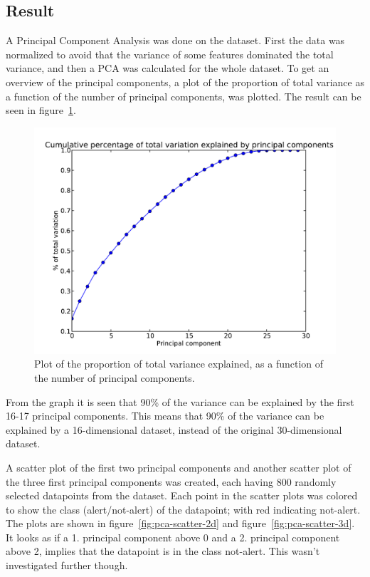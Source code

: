 \subsection{Result}
A Principal Component Analysis was done on the dataset. First the data was normalized to avoid that the variance of some features dominated the total variance, and then a PCA was calculated for the whole dataset. To get an overview of the principal components, a plot of the proportion of total variance as a function of the number of principal components, was plotted. The result can be seen in figure~\ref{fig:variance-explained}.\par
\begin{figure}
    \centering
    \includegraphics[width=.75\textwidth]{../sessions/15-new-principal-components-analysis/plots/pca-variation-explained.pdf}
    \caption{Plot of the proportion of total variance explained, as a function of the number of principal components.}\label{fig:variance-explained}
\end{figure}
From the graph it is seen that 90\% of the variance can be explained by the first 16-17 principal components. This means that 90\% of the variance can be explained by a 16-dimensional dataset, instead of the original 30-dimensional dataset.\par
A scatter plot of the first two principal components and another scatter plot of the three first principal components was created, each having 800 randomly selected datapoints from the dataset. Each point in the scatter plots was colored to show the class (alert/not-alert) of the datapoint; with red indicating not-alert. The plots are shown in figure~\ref{fig:pca-scatter-2d} and figure~\ref{fig:pca-scatter-3d}. It looks as if a 1. principal component above 0 and a 2. principal component above 2, implies that the datapoint is in the class not-alert. This wasn't investigated further though.
